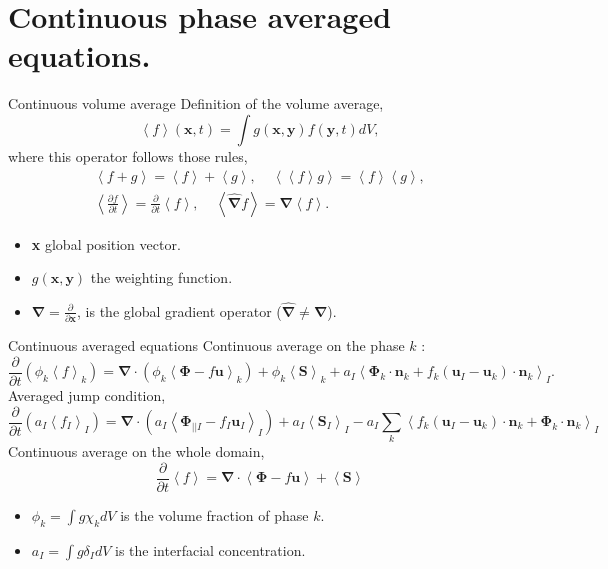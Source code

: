 \documentclass{sintefbeamer}
\newcommand{\avg}[1]{\left<#1\right>}
\newcommand{\kavg}[1]{\left<#1\right>_k}
\newcommand{\Iavg}[1]{\left<#1\right>_I}
\newcommand{\nablab}{\bm{\nabla}}
\newcommand{\nablabh}{\hat{\bm{\nabla}}}
\newcommand{\pddt}{\frac{\partial}{\partial t}}
\begin{document}
\section{Continuous phase averaged equations.}
\begin{frame}{Continuous volume average}
Definition of the volume average, 
  \begin{equation}
    \left<f\right>(\textbf{x},t) = \int g(\textbf{x},\textbf{y}) f(\textbf{y},t)dV,
    \label{eq:avg}
\end{equation}
where this operator follows those rules,
\begin{align}
  \left<f+g\right> = \left<f\right>+\left<g\right>, \;\;\;\;
  \left<\left<f\right>g\right> = \left<f\right>\left<g\right>, \\
  \left<\frac{\partial f}{\partial t}\right> 
  = \pddt\left<f\right>, \;\;\;\;
  \left<\nablabh f\right> 
  = \nablab\left<f\right>. 
  \label{eq:avg_properties}
\end{align}
\begin{itemize}
  \item \textbf{x} global position vector. 
  \item $g(\textbf{x},\textbf{y})$ the weighting function. 
  \item $\nablab = \frac{\partial}{\partial \textbf{x}}$, is the global gradient operator ($\nablabh \neq \nablab$).
\end{itemize}
\end{frame}

\begin{frame}{Continuous averaged equations}
  Continuous average on the phase $k$ : 
  \begin{equation*}
    \pddt (\phi_k\kavg{f})
    = \nablab \cdot \left(
        \phi_k \kavg{\bm{\Phi} - f \textbf{u}}
    \right)
    + \phi_k \kavg{\textbf{S}}
    + a_I \Iavg{
        \bm{\Phi}_k \cdot \textbf{n}_k
        + f_k 
        \left(
            \textbf{u}_I
            - \textbf{u}_k
        \right) \cdot \textbf{n}_k
    }.
    \label{eq:avg_k_global}
\end{equation*}
Averaged jump condition, 
\begin{equation}
  \pddt (a_I\Iavg{f_I})  
  = 
  \nablab \cdot \left(a_I \Iavg{\mathbf{\Phi}_{||I} - f_I \textbf{u}_I}\right)
  +a_I\Iavg{\textbf{S}_I} 
  - a_I \sum_k \Iavg{
  f_k (\textbf{u}_I - \textbf{u}_k)\cdot \textbf{n}_k
  + \mathbf{\Phi}_k\cdot \textbf{n}_k
  }
  \label{eq:avg_general_jump}
\end{equation}
Continuous average on the whole domain, 
\begin{equation*}
  \pddt \avg{f}
  = \nablab \cdot \avg{\bm{\Phi} - f \textbf{u}}
  + \avg{\textbf{S}}
  \label{eq:avg_global}
\end{equation*}
\begin{itemize}
  \item $\phi_k = \int g \chi_k dV$ is the volume fraction of phase $k$. 
  \item $a_I = \int g \delta_I dV$ is the interfacial concentration. 
\end{itemize}
\end{frame}
\end{document}
